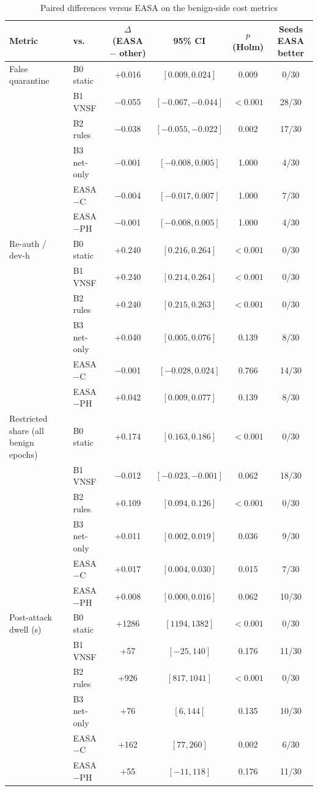 \begin{table}[!b]
\caption{Paired differences versus EASA on the benign-side cost metrics}
\label{tab:paired-cost}
\centering\scriptsize
\setlength{\tabcolsep}{4pt}
\begin{tabular}{llcccc}
\toprule
Metric & vs. & $\Delta$ (EASA $-$ other) & 95\% CI & $p$ (Holm) & Seeds EASA better \\
\midrule
False quarantine & B0 static & +0.016 & $[0.009, 0.024]$ & 0.009 & 0/30 \\
 & B1 VNSF & $-$0.055 & $[-0.067, -0.044]$ & $<0.001$ & 28/30 \\
 & B2 rules & $-$0.038 & $[-0.055, -0.022]$ & 0.002 & 17/30 \\
 & B3 net-only & $-$0.001 & $[-0.008, 0.005]$ & 1.000 & 4/30 \\
 & EASA$-$C & $-$0.004 & $[-0.017, 0.007]$ & 1.000 & 7/30 \\
 & EASA$-$PH & $-$0.001 & $[-0.008, 0.005]$ & 1.000 & 4/30 \\
\midrule
Re-auth / dev-h & B0 static & +0.240 & $[0.216, 0.264]$ & $<0.001$ & 0/30 \\
 & B1 VNSF & +0.240 & $[0.214, 0.264]$ & $<0.001$ & 0/30 \\
 & B2 rules & +0.240 & $[0.215, 0.263]$ & $<0.001$ & 0/30 \\
 & B3 net-only & +0.040 & $[0.005, 0.076]$ & 0.139 & 8/30 \\
 & EASA$-$C & $-$0.001 & $[-0.028, 0.024]$ & 0.766 & 14/30 \\
 & EASA$-$PH & +0.042 & $[0.009, 0.077]$ & 0.139 & 8/30 \\
\midrule
Restricted share (all benign epochs) & B0 static & +0.174 & $[0.163, 0.186]$ & $<0.001$ & 0/30 \\
 & B1 VNSF & $-$0.012 & $[-0.023, -0.001]$ & 0.062 & 18/30 \\
 & B2 rules & +0.109 & $[0.094, 0.126]$ & $<0.001$ & 0/30 \\
 & B3 net-only & +0.011 & $[0.002, 0.019]$ & 0.036 & 9/30 \\
 & EASA$-$C & +0.017 & $[0.004, 0.030]$ & 0.015 & 7/30 \\
 & EASA$-$PH & +0.008 & $[0.000, 0.016]$ & 0.062 & 10/30 \\
\midrule
Post-attack dwell (s) & B0 static & +1286 & $[1194, 1382]$ & $<0.001$ & 0/30 \\
 & B1 VNSF & +57 & $[-25, 140]$ & 0.176 & 11/30 \\
 & B2 rules & +926 & $[817, 1041]$ & $<0.001$ & 0/30 \\
 & B3 net-only & +76 & $[6, 144]$ & 0.135 & 10/30 \\
 & EASA$-$C & +162 & $[77, 260]$ & 0.002 & 6/30 \\
 & EASA$-$PH & +55 & $[-11, 118]$ & 0.176 & 11/30 \\
\bottomrule
\end{tabular}
\end{table}
